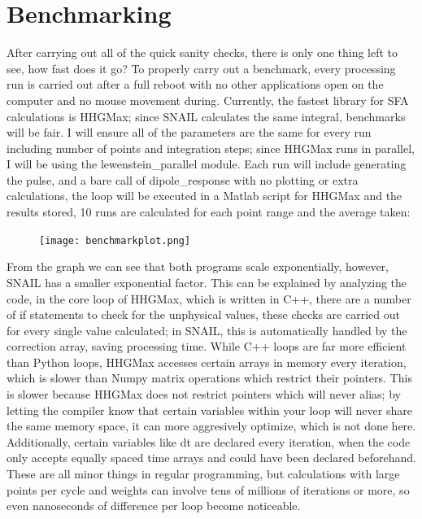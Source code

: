 \documentclass[11pt,a4paper]{report}
\begin{document}
\section{Benchmarking}
After carrying out all of the quick sanity checks, there is only one thing left to see, how fast does it go? To properly carry out a benchmark, every processing run is carried out after a full reboot with no other applications open on the computer and no mouse movement during. Currently, the fastest library for SFA calculations is HHGMax; since SNAIL calculates the same integral, benchmarks will be fair. I will ensure all of the parameters are the same for every run including number of points and integration steps; since HHGMax runs in parallel, I will be using the lewenstein\_parallel module. Each run will include generating the pulse, and a bare call of dipole\_response with no plotting or extra calculations, the loop will be executed in a Matlab script for HHGMax and the results stored, 10 runs are calculated for each point range and the average taken:
\begin{figure}[h]
\centering
\texttt{[image: benchmarkplot.png]}
\end{figure}
From the graph we can see that both programs scale exponentially, however, SNAIL has a smaller exponential factor. This can be explained by analyzing the code, in the core loop of HHGMax, which is written in C++, there are a number of if statements to check for the unphysical values, these checks are carried out for every single value calculated; in SNAIL, this is automatically handled by the correction array, saving processing time. While C++ loops are far more efficient than Python loops, HHGMax accesses certain arrays in memory every iteration, which is slower than Numpy matrix operations which restrict their pointers. This is slower because HHGMax does not restrict pointers which will never alias; by letting the compiler know that certain variables within your loop will never share the same memory space, it can more aggresively optimize, which is not done here. Additionally, certain variables like dt are declared every iteration, when the code only accepts equally spaced time arrays and could have been declared beforehand. These are all minor things in regular programming, but calculations with large points per cycle and weights can involve tens of millions of iterations or more, so even nanoseconds of difference per loop become noticeable.
\newpage
\end{document}
